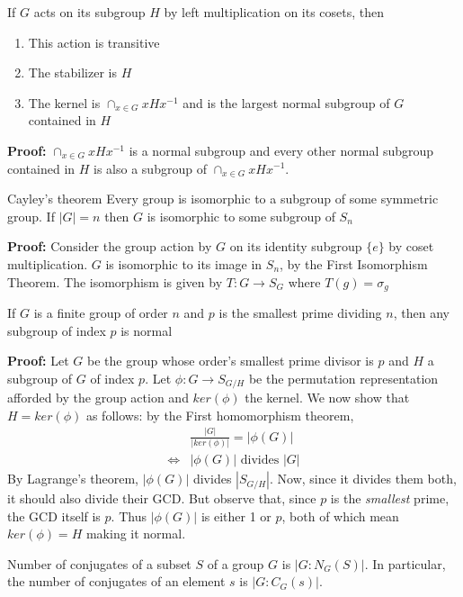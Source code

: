 \documentclass[titlepage, 12pt]{article}
\begin{document}
\begin{theorem}{}{}
    If $G$ acts on its subgroup $H$ by left multiplication on its cosets, then
    \begin{enumerate}
        \item This action is transitive
        \item The stabilizer is $H$
        \item The kernel is $\cap_{x\in G} xHx^{-1}$ and is the largest normal
            subgroup of $G$ contained in $H$
    \end{enumerate}
\end{theorem}
\textbf{Proof:} $\cap_{x\in G} xHx^{-1}$ is a normal subgroup and every other
normal subgroup contained in $H$ is also a subgroup of $\cap_{x\in G} xHx^{-1}$.

\begin{theorem}{Cayley's theorem}{}
    Every group is isomorphic to a subgroup of some symmetric group. If $|G| =
    n$ then $G$ is isomorphic to some subgroup of $S_n$
\end{theorem}
\textbf{Proof:} Consider the group action by $G$ on its identity subgroup $\{e\}$
by coset multiplication. $G$ is isomorphic to its image in $S_n$, by the First
Isomorphism Theorem. The isomorphism is given by $T:G\rightarrow S_G$ where
$T(g) = \sigma_g$

\begin{theorem}{}{}
    If $G$ is a finite group of order $n$ and $p$ is the smallest prime dividing
    $n$, then any subgroup of index $p$ is normal
\end{theorem}
\textbf{Proof:} Let $G$ be the group whose order's smallest prime divisor is $p$
and $H$ a subgroup of $G$ of index $p$. Let $\phi: G\rightarrow S_{G/H}$ be the
permutation representation afforded by the group action and $ker(\phi)$ the
kernel. We now show that $H = ker(\phi)$ as follows: by the First homomorphism
theorem,
\begin{align*}
         &\frac{|G|}{|ker(\phi)|} = |\phi(G)|\\
    \iff &|\phi(G)|\textrm{ divides } |G|
\end{align*}
By Lagrange's theorem, $|\phi(G)|$ divides $|S_{G/H}|$. Now, since it divides them
both, it should also divide their GCD. But observe that, since $p$ is the
\textit{smallest} prime, the GCD itself is $p$. Thus $|\phi(G)|$ is either 1 or
$p$, both of which mean $ker(\phi) = H$ making it normal.

\begin{proposition}{}{}
    Number of conjugates of a subset $S$ of a group $G$ is $|G:N_G(S)|$. In
    particular, the number of conjugates of an element $s$ is $|G:C_G(s)|$.
\end{proposition}
\end{document}
